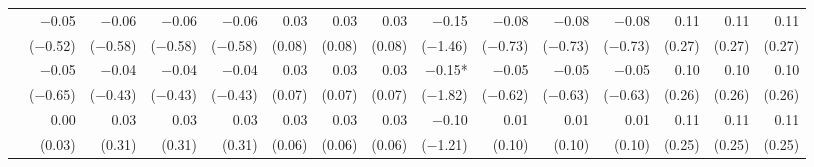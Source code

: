 \begin{tabularx}{1.45\textwidth}{lRRRRRRRRRRRRRR}
		 & \num{-0.05}\phantom{***)} & \num{-0.06}\phantom{***)} & \num{-0.06}\phantom{***)} & \num{-0.06}\phantom{***)} & \num{0.03}\phantom{***)} & \num{0.03}\phantom{***)} & \num{0.03}\phantom{***)} & \num{-0.15}\phantom{***)} & \num{-0.08}\phantom{***)} & \num{-0.08}\phantom{***)} & \num{-0.08}\phantom{***)} & \num{0.11}\phantom{***)} & \num{0.11}\phantom{***)} & \num{0.11}\phantom{***)} \\
		 & (\num{-0.52})\phantom{***} & (\num{-0.58})\phantom{***} & (\num{-0.58})\phantom{***} & (\num{-0.58})\phantom{***} & (\num{0.08})\phantom{***} & (\num{0.08})\phantom{***} & (\num{0.08})\phantom{***} & (\num{-1.46})\phantom{***} & (\num{-0.73})\phantom{***} & (\num{-0.73})\phantom{***} & (\num{-0.73})\phantom{***} & (\num{0.27})\phantom{***} & (\num{0.27})\phantom{***} & (\num{0.27})\phantom{***} \\ [\dspacing]
		 & \num{-0.05}\phantom{***)} & \num{-0.04}\phantom{***)} & \num{-0.04}\phantom{***)} & \num{-0.04}\phantom{***)} & \num{0.03}\phantom{***)} & \num{0.03}\phantom{***)} & \num{0.03}\phantom{***)} & \num{-0.15}*\phantom{**)} & \num{-0.05}\phantom{***)} & \num{-0.05}\phantom{***)} & \num{-0.05}\phantom{***)} & \num{0.10}\phantom{***)} & \num{0.10}\phantom{***)} & \num{0.10}\phantom{***)} \\
		 & (\num{-0.65})\phantom{***} & (\num{-0.43})\phantom{***} & (\num{-0.43})\phantom{***} & (\num{-0.43})\phantom{***} & (\num{0.07})\phantom{***} & (\num{0.07})\phantom{***} & (\num{0.07})\phantom{***} & (\num{-1.82})\phantom{***} & (\num{-0.62})\phantom{***} & (\num{-0.63})\phantom{***} & (\num{-0.63})\phantom{***} & (\num{0.26})\phantom{***} & (\num{0.26})\phantom{***} & (\num{0.26})\phantom{***} \\ [\dspacing]
		 & \num{0.00}\phantom{***)} & \num{0.03}\phantom{***)} & \num{0.03}\phantom{***)} & \num{0.03}\phantom{***)} & \num{0.03}\phantom{***)} & \num{0.03}\phantom{***)} & \num{0.03}\phantom{***)} & \num{-0.10}\phantom{***)} & \num{0.01}\phantom{***)} & \num{0.01}\phantom{***)} & \num{0.01}\phantom{***)} & \num{0.11}\phantom{***)} & \num{0.11}\phantom{***)} & \num{0.11}\phantom{***)} \\
		 & (\num{0.03})\phantom{***} & (\num{0.31})\phantom{***} & (\num{0.31})\phantom{***} & (\num{0.31})\phantom{***} & (\num{0.06})\phantom{***} & (\num{0.06})\phantom{***} & (\num{0.06})\phantom{***} & (\num{-1.21})\phantom{***} & (\num{0.10})\phantom{***} & (\num{0.10})\phantom{***} & (\num{0.10})\phantom{***} & (\num{0.25})\phantom{***} & (\num{0.25})\phantom{***} & (\num{0.25})\phantom{***} \\ [\dspacing]

\end{tabularx}
